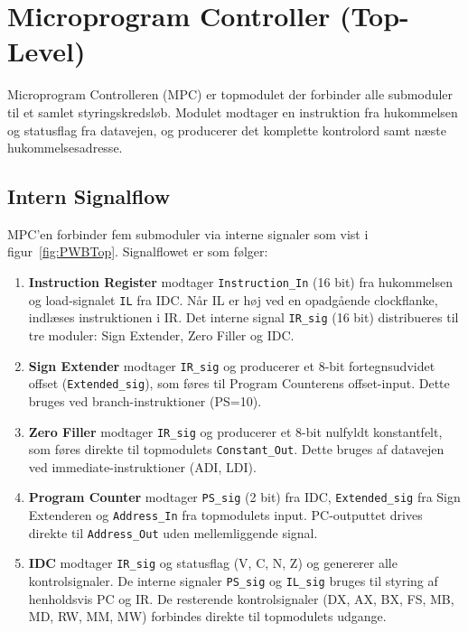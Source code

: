 \documentclass{article}
\begin{document}
\fi

\section{Microprogram Controller (Top-Level)}
\label{sec:mpc}

Microprogram Controlleren (MPC) er topmodulet der forbinder alle submoduler til et samlet styringskredsløb. Modulet modtager en instruktion fra hukommelsen og statusflag fra datavejen, og producerer det komplette kontrolord samt næste hukommelsesadresse.

\subsection{Intern Signalflow}
\label{sec:mpc-signals}

MPC'en forbinder fem submoduler via interne signaler som vist i figur~\ref{fig:PWBTop}. Signalflowet er som følger:

\begin{enumerate}
    \item \textbf{Instruction Register} modtager \texttt{Instruction\_In} (16 bit) fra hukommelsen og load-signalet \texttt{IL} fra IDC. Når IL er høj ved en opadgående clockflanke, indlæses instruktionen i IR. Det interne signal \texttt{IR\_sig} (16 bit) distribueres til tre moduler: Sign Extender, Zero Filler og IDC.

    \item \textbf{Sign Extender} modtager \texttt{IR\_sig} og producerer et 8-bit fortegnsudvidet offset (\texttt{Extended\_sig}), som føres til Program Counterens offset-input. Dette bruges ved branch-instruktioner (PS=10).

    \item \textbf{Zero Filler} modtager \texttt{IR\_sig} og producerer et 8-bit nulfyldt konstantfelt, som føres direkte til topmodulets \texttt{Constant\_Out}. Dette bruges af datavejen ved immediate-instruktioner (ADI, LDI).

    \item \textbf{Program Counter} modtager \texttt{PS\_sig} (2 bit) fra IDC, \texttt{Extended\_sig} fra Sign Extenderen og \texttt{Address\_In} fra topmodulets input. PC-outputtet drives direkte til \texttt{Address\_Out} uden mellemliggende signal.

    \item \textbf{IDC} modtager \texttt{IR\_sig} og statusflag (V, C, N, Z) og genererer alle kontrolsignaler. De interne signaler \texttt{PS\_sig} og \texttt{IL\_sig} bruges til styring af henholdsvis PC og IR. De resterende kontrolsignaler (DX, AX, BX, FS, MB, MD, RW, MM, MW) forbindes direkte til topmodulets udgange.
\end{enumerate}
\end{document}
